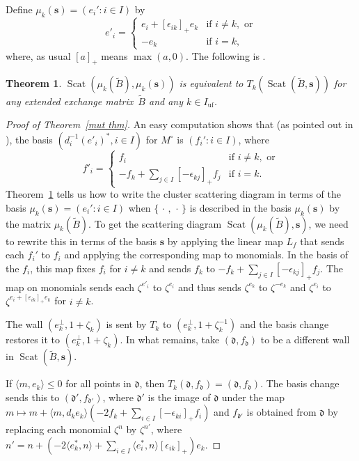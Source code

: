 \documentclass{amsart}
\newtheorem{thm}[proposition]{Theorem}
\theoremstyle{definition}
\theoremstyle{remark}
\numberwithin{equation}{section}
\newcommand{\ep}{\varepsilon}
\newcommand{\uf}{{\operatorname{uf}}}
\newcommand{\set}[1]{{\lbrace #1 \rbrace}}
\newcommand{\br}[1]{{\langle #1 \rangle}}
\newcommand{\0}{{\mathbf{0}}}
\newcommand{\s}{\mathbf{s}}
\newcommand{\tB}{\tilde{B}}
\newcommand{\Scat}{\operatorname{Scat}}
\renewcommand{\d}{{\mathfrak d}}
\begin{document}
Define $\mu_k(\s)=(e_i':i\in I)$ by
\[e'_i=\begin{cases}
e_i+[\epsilon_{ik}]_+e_k&\text{if }i\neq k,\text{ or}\\
-e_k&\text{if }i=k,
\end{cases}\]
where, as usual $[a]_+$ means $\max(a,0)$.
The following is \cite[Theorem~1.24]{GHKK}.

\begin{thm}\label{mut GHKK}
$\Scat(\mu_k(\tB),\mu_k(\s))$ is equivalent to $T_k(\Scat(\tB,\s))$ for any extended exchange matrix~$\tB$ and any $k\in I_\uf$.
\end{thm}

\begin{proof}[Proof of Theorem~\ref{mut thm}]
An easy computation shows that (as pointed out in \cite[Section~2]{GHK}), the basis $(d_i^{-1}(e'_i)^*,i\in I)$ for $M^\circ$ is $(f_i':i\in I)$, where 
\[f'_i=\begin{cases}
f_i&\text{if }i\neq k,\text{ or}\\
-f_k+\sum_{j\in I}[-\epsilon_{kj}]_+f_j&\text{if }i=k.
\end{cases}\]
Theorem~\ref{mut GHKK} tells us how to write the cluster scattering diagram in terms of the basis $\mu_k(\s)=(e_i':i\in I)$ when $\set{\,\cdot\,,\,\cdot\,}$ is described in the basis $\mu_k(\s)$ by the matrix $\mu_k(\tB)$.
To get the scattering diagram $\Scat(\mu_k(\tB),\s)$, we need to rewrite this in terms of the basis $\s$ by applying the linear map $L_f$ that sends each $f_i'$ to $f_i$ and applying the corresponding map to monomials.
In the basis of the $f_i$, this map fixes $f_i$ for $i\neq k$ and sends $f_k$ to $-f_k+\sum_{j\in I}[-\epsilon_{kj}]_+f_j$.
The map on monomials sends each $\zeta^{e'_i}$ to $\zeta^{e_i}$ and thus sends $\zeta^{e_k}$ to $\zeta^{-e_k}$ and $\zeta^{e_i}$ to $\zeta^{e_i+[\ep_{ik}]_+e_k}$ for $i\neq k$. 

The wall $(e_k^\perp,1+\zeta_k)$ is sent by $T_k$ to $(e_k^\perp,1+\zeta_k^{-1})$ and the basis change restores it to $(e_k^\perp,1+\zeta_k)$.
In what remains, take $(\d,f_\d)$  to be a different wall in $\Scat(\tB,\s)$.

If $\br{m,e_k}\le0$ for all points in $\d$, then $T_k(\d,f_\d)=(\d,f_\d)$.
The basis change sends this to $(\d',f_{\d'})$, where $\d'$ is the image of $\d$ under the map $m\mapsto m+\br{m,d_ke_k}{(-2f_k+\sum_{i\in I}[-\epsilon_{ki}]_+f_i)}$ and $f_{\d'}$ is obtained from $\d$ by replacing each monomial $\zeta^n$ by $\zeta^{n'}$, where $n'=n +(-2\br{e^*_k,n}+\sum_{i\in I}\br{e^*_i,n}[\epsilon_{ik}]_+)e_k$.


\end{proof}
\end{document}
